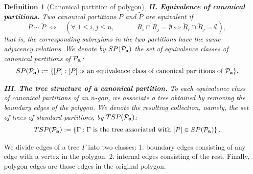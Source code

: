 \documentclass[10pt,reqno]{article}
\theoremstyle{plain} %
\newtheorem{definition}[theorem]{Definition}
\theoremstyle{remark}
\numberwithin{equation}{section}
\begin{document}
\begin{definition}[Canonical partition of polygon]
\medskip 
\noindent 
\noindent\textbf{II. Equivalence of canonical partitions.}
Two canonical partitions $P$ and $\widetilde P$ are equivalent if
$$
 P\sim \widetilde{P}\;\iff
\quad \left(\forall\; 1\le  i,j\le n, \quad \quad \quad \; R_{i}\cap R_j=\emptyset \iff
  \widetilde{R}_{i}\cap \widetilde{R}_j=\emptyset \right), 
$$
that is, the corresponding subregions in the two partitions have the same adjacency relations.
We denote by $SP({\cal P}_{\textbf{a}})$ the set of equivalence classes of canonical partitions of ${\cal P}_{\textbf{a}}$:
$$
SP({\cal P}_{\textbf{a}}):=\{[P]: [P] \text{ is an equivalence class of canonical partitions of } {\cal P}_{\textbf{a}}\}.
$$

\medskip 
\noindent\textbf{III. The tree structure of a canonical partition.}
To each equivalence class of canonical partitions of an $n$-gon, we associate a tree obtained by removing the boundary edges of the polygon. We denote the resulting collection, namely, the set of trees of standard partitions, by $TSP({\cal P}_{\textbf{a}})$:
$$
TSP({\cal P}_{\textbf{a}}):=\left\{\Gamma: \Gamma \text{ is the tree associated with } [P]\in SP({\cal P}_{\textbf{a}})\right\}.$$



\end{definition}

{We divide edges of a tree $\Gamma$ into two classes: 1. boundary edges consisting of any edge with a vertex in the polygon. 2. internal edges consisting of the rest.  Finally, polygon edges are those edges in the original polygon. }
 
\end{document}
